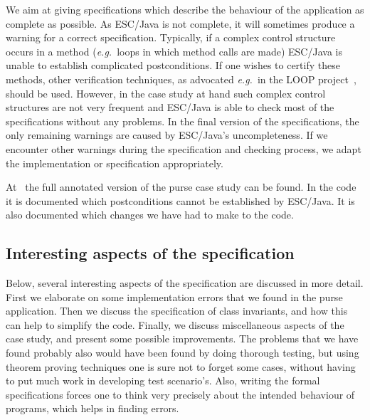 \documentclass[a4paper]{llncs}
\begin{document}
We aim at giving specifications which describe the behaviour of the
application as complete as possible. As ESC/Java is not complete, it
will sometimes produce a warning for a correct specification. 
Typically, if a complex control structure occurs in a method
(\emph{e.g.}~loops in which method calls are made) ESC/Java is unable
to establish complicated postconditions. If one wishes to certify
these methods, other verification techniques, as advocated
\emph{e.g.}~in the LOOP project~\cite{LOOPUrl}, should be
used. However, in the case study at hand such complex control
structures are not very frequent and ESC/Java is able to check most of
the specifications without any problems. In the final version of the
specifications, the only remaining warnings are caused by ESC/Java's
uncompleteness. If we encounter other warnings during the
specification and checking process, we adapt the implementation or
specification appropriately.

At~\cite{CatanoH01Url} the full annotated version of the purse case
study can be found. In the code it is documented which postconditions
cannot be established by ESC/Java. It is also documented which changes 
we have had to make to the code.




\subsection{Interesting aspects of the specification}\label{SectSpecDetails}
Below, several interesting aspects of the specification are discussed
in more detail. First we elaborate on some implementation errors that
we found in the purse application.  Then we discuss the specification
of class invariants, and how this can help to simplify the
code. Finally, we discuss miscellaneous aspects of the case study, and
present some possible improvements. The problems that we have found
probably also would have been found by doing thorough testing, but
using theorem proving techniques one is sure not to forget some cases,
without having to put much work in developing test scenario's.  Also,
writing the formal specifications forces one to think very precisely
about the intended behaviour of programs, which helps in finding
errors.
\end{document}
